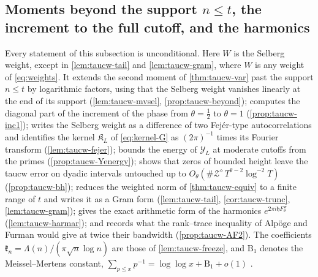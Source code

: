 \documentclass[11pt,a4paper]{article}
\numberwithin{equation}{section}
\theoremstyle{definition}
\theoremstyle{remark}
\begin{document}
\subsection{Moments beyond the support \texorpdfstring{$n\le t$}{n <= t}, the increment to the full cutoff, and the harmonics}\label{sec:taucw-beyond}
Every statement of this subsection is unconditional. Here $W$ is the Selberg weight, except in \cref{lem:taucw-tail} and \cref{lem:taucw-gram}, where $W$ is any weight of \eqref{eq:weights}. It extends the second moment of \cref{thm:taucw-var} past the support $n\le t$ by logarithmic factors, using that the Selberg weight vanishes linearly at the end of its support (\cref{lem:taucw-mvsel}, \cref{prop:taucw-beyond}); computes the diagonal part of the increment of the phase from $\theta=\frac12$ to $\theta=1$ (\cref{prop:taucw-inc1}); writes the Selberg weight as a difference of two Fej\'er-type autocorrelations and identifies the kernel $\mathfrak K_L$ of \eqref{eq:kernel-G} as $(2\pi)^{-1}$ times its Fourier transform (\cref{lem:taucw-fejer}); bounds the energy of $\mathcal Y_L$ at moderate cutoffs from the primes (\cref{prop:taucw-Yenergy}); shows that zeros of bounded height leave the taucw error on dyadic intervals untouched up to $O_\theta(\#\mathscr Z^\diamond\,T^{\theta-2}\log^{-2}T)$ (\cref{prop:taucw-bh}); reduces the weighted norm of \cref{thm:taucw-equiv} to a finite range of $t$ and writes it as a Gram form (\cref{lem:taucw-tail}, \cref{cor:taucw-trunc}, \cref{lem:taucw-gram}); gives the exact arithmetic form of the harmonics $e^{2\pi i\mathfrak hF^{\mathrm w}_\theta}$ (\cref{lem:taucw-harmar}); and records what the rank--trace inequality of Alp\"oge and Furman \cite{AlpogeFurman2026} would give at twice their bandwidth (\cref{prop:taucw-AF2}). The coefficients $\mathfrak k_n=\Lambda(n)/(\pi\sqrt n\log n)$ are those of \cref{lem:taucw-freeze}, and $\mathrm B_1$ denotes the Meissel--Mertens constant, $\sum_{p\le x}p^{-1}=\log\log x+\mathrm B_1+o(1)$ \cite{Mertens1874}.
\end{document}
